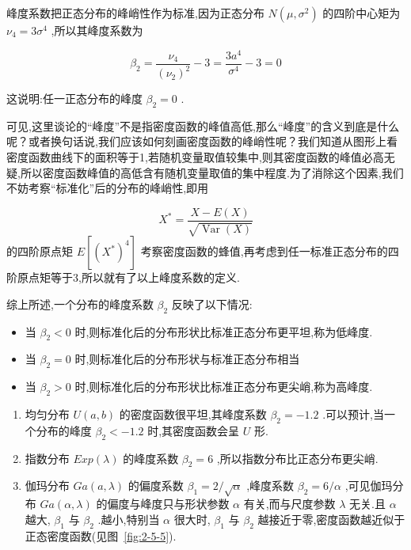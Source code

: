 峰度系数把正态分布的峰峭性作为标准,因为正态分布 $ N\left(\mu, \sigma^{2}\right) $ 的四阶中心矩为 $ \nu_{4}=3 \sigma^{4} $ ,所以其峰度系数为

\[
\beta_{2}=\frac{\nu_{4}}{\left(\nu_{2}\right)^{2}}-3=\frac{3 a^{4}}{\sigma^{4}}-3=0
\]

这说明:任一正态分布的峰度 $ \beta_{2}=0 $ .

可见,这里谈论的“峰度”不是指密度函数的峰值高低,那么“峰度”的含义到底是什么呢？或者换句话说,我们应该如何刻画密度函数的峰峭性呢？我们知道从图形上看密度函数曲线下的面积等于1,若随机变量取值较集中,则其密度函数的峰值必高无疑,所以密度函数峰值的高低含有随机变量取值的集中程度.为了消除这个因素,我们不妨考察“标准化”后的分布的峰峭性,即用

\[
X^{*}=\frac{X-E(X)}{\sqrt{\operatorname{Var}(X)}}
\]
的四阶原点矩 $ E\left[\left(X^{*}\right)^{4}\right] $ 考察密度函数的蜂值,再考虑到任一标准正态分布的四阶原点矩等于3,所以就有了以上峰度系数的定义.

综上所述,一个分布的峰度系数 $ \beta_{2} $ 反映了以下情况:

\begin{itemize}
	\item 当 $ \beta_{2}<0 $ 时,则标准化后的分布形状比标准正态分布更平坦,称为低峰度.
	\item 当 $ \beta_{2}=0 $ 时,则标准化后的分布形状与标准正态分布相当
	\item 当 $ \beta_{2}>0 $ 时,则标准化后的分布形状比标准正态分布更尖峭,称为高峰度.
\end{itemize}

\begin{example}
	\begin{enumerate}
		\item 均匀分布 $ U(a,b) $ 的密度函数很平坦,其峰度系数 $ \beta_{2}= -1.2 $ .可以预计,当一个分布的峰度 $ \beta_{2}<-1.2 $ 时,其密度函数会呈 $ U $ 形.
		\item 指数分布 $ E x p(\lambda) $ 的峰度系数 $ \beta_{2}=6 $ ,所以指数分布比正态分布更尖峭.
		\item 伽玛分布 $ G a(a, \lambda) $ 的偏度系数 $ \beta_{1}=2 / \sqrt{\alpha} $ ,峰度系数 $ \beta_{2}=6 / \alpha $ ,可见伽玛分布 $ G a(\alpha, \lambda) $ 的偏度与峰度只与形状参数 $ \alpha $ 有关,而与尺度参数 $ \lambda $ 无关.且 $ \alpha $ 越大, $ \beta_{1} $ 与 $ \beta_{2} $ .越小,特别当 $ \alpha $ 很大时, $ \beta_{1} $ 与 $ \beta_{2} $ 越接近于零,密度函数越近似于正态密度函数(见图~\ref{fig:2-5-5}).
	\end{enumerate}
\end{example}


